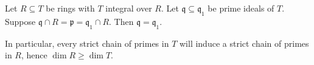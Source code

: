 Let $R \subseteq T$ be rings with $T$ integral over $R$. Let $\mathfrak{q} \subseteq \mathfrak{q}_1$
be prime ideals of $T$. Suppose $\mathfrak{q}\cap R = \mathfrak{p} = \mathfrak{q}_1 \cap R$.
Then $\mathfrak{q} = \mathfrak{q}_1$.

In particular, every strict chain of primes in $T$ will induce a strict chain of primes in
$R$, hence $\dim R \geq \dim T$.
